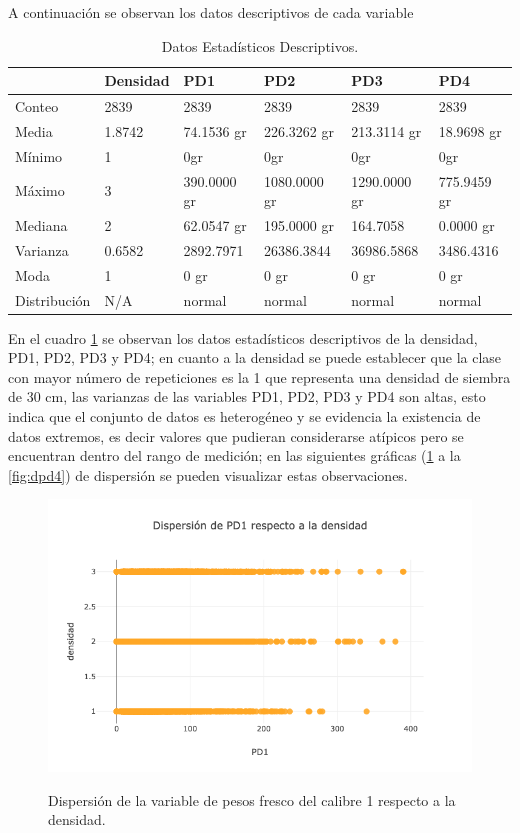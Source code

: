 A continuación se observan los datos descriptivos de cada variable

\begin{table}[htbp]
\begin{center}
\begin{tabular}{|l|l|l|l|l|l|}
\hline
& Densidad & PD1 & PD2 & PD3 & PD4  \\
\hline \hline
Conteo & 2839 & 2839 & 2839 & 2839 & 2839  \\ \hline
Media & 1.8742 & 74.1536 gr & 226.3262 gr & 213.3114 gr & 18.9698 gr  \\ \hline
Mínimo & 1 & 0gr & 0gr & 0gr & 0gr  \\ \hline
Máximo & 3 & 390.0000 gr & 1080.0000 gr & 1290.0000 gr & 775.9459 gr  \\ \hline
Mediana & 2 & 62.0547 gr &195.0000 gr & 164.7058 & 0.0000 gr \\ \hline
Varianza & 0.6582 & 2892.7971 & 26386.3844 & 36986.5868 & 3486.4316 \\ \hline
Moda & 1 & 0 gr & 0 gr &  0 gr & 0 gr  \\ \hline
Distribución & N/A & normal & normal & normal & normal  \\ \hline
\end{tabular}
\caption{Datos Estadísticos Descriptivos.}
\label{tabla:descriptivos}
\end{center}
\end{table}
En el cuadro \ref{tabla:descriptivos} se observan los datos estadísticos descriptivos de la densidad, PD1, PD2, PD3 y PD4; en cuanto a la densidad se puede establecer que la clase con mayor número de repeticiones es la 1 que representa una densidad de siembra de 30 cm, las varianzas de las variables PD1, PD2, PD3 y PD4 son altas, esto indica que el conjunto de datos es heterogéneo y se evidencia la existencia de datos extremos, es decir valores que pudieran considerarse atípicos pero se encuentran dentro del rango de medición;  en las siguientes gráficas (\ref{fig:dpd1} a la \ref{fig:dpd4}) de dispersión se pueden visualizar estas observaciones.\\

\begin{figure}[h!]
	\caption{Dispersión de la variable de pesos fresco del calibre 1 respecto a la densidad.}
	\centering
	\includegraphics[scale=0.5]{d-pd1.png}
	\label{fig:dpd1}
\end{figure}

